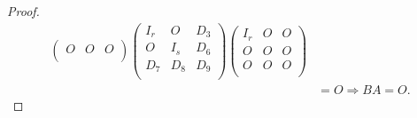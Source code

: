 \documentclass[../../main.tex]{subfiles}%
\begin{document}
\begin{proof}
\begin{align*}
\begin{pmatrix}
O&	O&	O\\
\end{pmatrix} \begin{pmatrix}
I_r&	O&	D_3\\
O&	I_s&	D_6\\
D_7&	D_8&	D_9\\
\end{pmatrix} \begin{pmatrix}
I_r&	O&	O\\
O&	O&	O\\
O&	O&	O\\
\end{pmatrix}\\
&=O\Longrightarrow BA=O.
\end{align*}

\end{proof}
\end{document}
